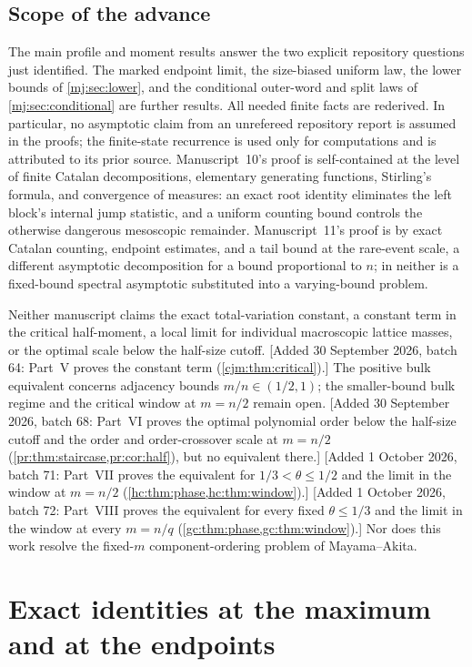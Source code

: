 \documentclass[11pt,a4paper]{article}
\theoremstyle{definition}\newaliascnt{definition}{theorem}
\theoremstyle{remark}\newaliascnt{remark}{theorem}
\begin{document}
\subsection{Scope of the advance}
The main profile and moment results answer the two explicit repository
questions just identified. The marked endpoint limit, the size-biased
uniform law, the lower bounds of \cref{mj:sec:lower}, and the conditional
outer-word and split laws of \cref{mj:sec:conditional} are further results.
All needed finite facts are rederived. In particular, no asymptotic claim
from an unrefereed repository report is assumed in the proofs; the
finite-state recurrence is used only for computations and is attributed to
its prior source. Manuscript~10's proof is self-contained at the level of
finite Catalan decompositions, elementary generating functions, Stirling's
formula, and convergence of measures: an exact root identity eliminates the
left block's internal jump statistic, and a uniform counting bound controls
the otherwise dangerous mesoscopic remainder. Manuscript~11's proof is by
exact Catalan counting, endpoint estimates, and a tail bound at the
rare-event scale, a different asymptotic decomposition for a bound
proportional to $n$; in neither is a fixed-bound spectral asymptotic
substituted into a varying-bound problem.

Neither manuscript claims the exact total-variation constant, a constant
term in the critical half-moment, a local limit for individual macroscopic
lattice masses, or the optimal scale below the half-size cutoff. [Added 30 September
2026, batch 64: Part~V proves the constant term (\cref{cjm:thm:critical}).] The
positive bulk equivalent concerns adjacency bounds $m/n\in(1/2,1)$; the
smaller-bound bulk regime and the critical window at $m=n/2$ remain open.
[Added 30 September 2026, batch 68: Part~VI proves the optimal polynomial
order below the half-size cutoff and the order and order-crossover scale at
$m=n/2$ (\cref{pr:thm:staircase,pr:cor:half}), but no equivalent there.]
[Added 1 October 2026, batch 71: Part~VII proves the equivalent for
$1/3<\theta\le1/2$ and the limit in the window at $m=n/2$
(\cref{hc:thm:phase,hc:thm:window}).]
[Added 1 October 2026, batch 72: Part~VIII proves the equivalent for every
fixed $\theta\le1/3$ and the limit in the window at every $m=n/q$
(\cref{gc:thm:phase,gc:thm:window}).]
Nor does this work resolve the fixed-$m$ component-ordering problem of
Mayama--Akita.

\section{Exact identities at the maximum and at the endpoints}
\label{mj:sec:root}
\end{document}
